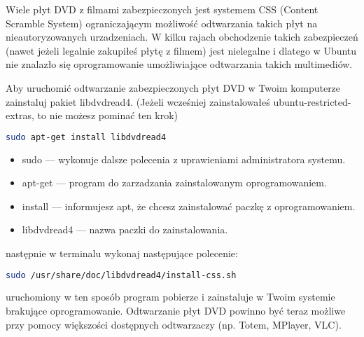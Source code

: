 Wiele płyt DVD z filmami zabezpieczonych jest systemem CSS (Content Scramble System) ograniczającym możliwość odtwarzania takich płyt na nieautoryzowanych urzadzeniach. W kilku rajach obchodzenie takich zabezpieczeń (nawet jeżeli legalnie zakupiłeś płytę z filmem) jest nielegalne i dlatego w Ubuntu nie znalazło się oprogramowanie umożliwiające odtwarzania takich multimediów.

Aby uruchomić odtwarzanie zabezpieczonych płyt DVD w Twoim komputerze zainstaluj pakiet \textcolor{ubuntu_orange}{libdvdread4}. (Jeżeli wcześniej zainstalowałeś ubuntu-restricted-extras, to nie możesz pominać ten krok)
\begin{lstlisting}[language=bash]
sudo apt-get install libdvdread4
\end{lstlisting}
\begin{itemize}
\item \textcolor{ubuntu_orange}{sudo} --- wykonuje dalsze polecenia z uprawieniami administratora systemu.
\item \textcolor{ubuntu_orange}{apt-get} --- program do zarzadzania zainstalowanym oprogramowaniem.
\item \textcolor{ubuntu_orange}{install} --- informujesz apt, że chcesz zainstalować paczkę z oprogramowaniem.
\item \textcolor{ubuntu_orange}{libdvdread4} --- nazwa paczki do zainstalowania.
\end{itemize}

następnie w terminalu wykonaj następujące polecenie:
\begin{lstlisting}[language=bash]
sudo /usr/share/doc/libdvdread4/install-css.sh
\end{lstlisting}
uruchomiony w ten sposób program pobierze i zainstaluje w Twoim systemie brakujące oprogramowanie. Odtwarzanie płyt DVD powinno być teraz możliwe przy pomocy większości dostępnych odtwarzaczy (np. Totem, MPlayer, VLC).